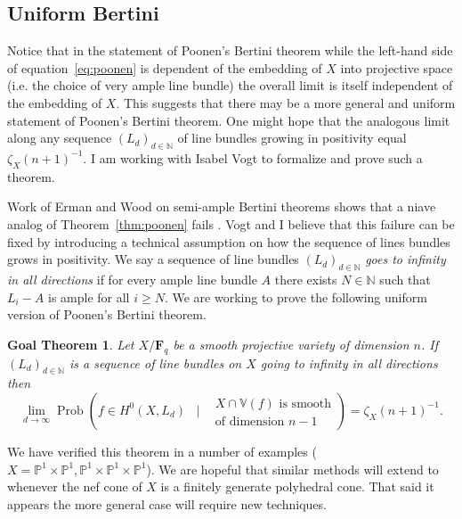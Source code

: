 \documentclass[11pt,reqno]{amsart}
\newtheorem{goalTheorem}[lemma]{Goal Theorem}
\theoremstyle{remark}
\newcommand{\Prob}{\operatorname{Prob}}
\newcommand{\fF}{\mathbf F}
\newcommand{\N}{\mathbb{N}}
\renewcommand{\P}{\mathbb{P}}
\newcommand{\V}{\mathbb{V}}
\begin{document}
\subsection{Uniform Bertini}

Notice that in the statement of Poonen's Bertini theorem while the left-hand side of equation~\eqref{eq:poonen} is dependent of the embedding of $X$ into projective space (i.e. the choice of very ample line bundle) the overall limit is itself independent of the embedding of $X$. This suggests that there may be a more general and uniform statement of Poonen's Bertini theorem. One might hope that the analogous limit along any sequence $(L_{d})_{d\in\N}$ of line bundles growing in positivity equal $\zeta_{X}(n+1)^{-1}$. I am working with Isabel Vogt to formalize and prove such a theorem.

Work of Erman and Wood on semi-ample Bertini theorems shows that a niave analog of Theorem~\ref{thm:poonen} fails \cite{ermanWood15}. Vogt and I believe that this failure can be fixed by introducing a technical assumption on how the sequence of lines bundles grows in positivity. We say a sequence of line bundles  $\left(L_{d}\right)_{d\in\N}$ \textit{goes to infinity in all directions} if for every ample line bundle $A$ there exists $N\in \N$ such that $L_{i}-A$ is ample for all $i\geq N$. We are working to prove the following uniform version of Poonen's Bertini theorem.
 
\begin{goalTheorem}\label{gthm:effective-bertini}
Let $X/\fF_{q}$ be a smooth projective variety of dimension $n$. If $\left(L_{d}\right)_{d\in\N}$ is a sequence of line bundles on $X$ going to infinity in all directions then 
\begin{equation}
\lim_{d\to \infty} \Prob\left(f \in H^0\left(X, L_{d}\right)  \;\;\; \bigg| \;\;\; 
\begin{matrix}
 \text{$X\cap\V(f)$ is smooth}\\
 \text{of dimension $n-1$}
 \end{matrix}
\right)=
\zeta_X(n+1)^{-1}.
\end{equation}
\end{goalTheorem}

We have verified this theorem in a number of examples ($X=\P^1\times\P^1, \P^1\times\P^1\times\P^1$). We  are hopeful that similar methods will extend to whenever the nef cone of $X$ is a finitely generate polyhedral cone. That said it appears the more general case  will require new techniques. 
\end{document}

